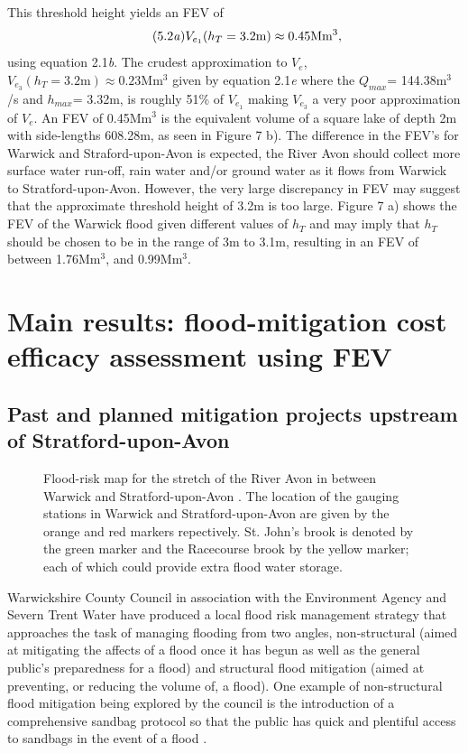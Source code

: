 \documentclass[11pt,a4paper]{article}
\begin{document}
This threshold height yields an FEV of
\begin{equation}\tag{5.2\textit{a}}
V_{e_1}(h_T=\text{3.2m})\approx 0.45\text{Mm$^3$},
\end{equation}
using equation 2.1\textit{b}. The crudest approximation to $V_e$, $V_{e_3}(h_T=\text{3.2m})\approx 0.23\text{Mm$^3$}$ given by equation 2.1\textit{e} where the $Q_{max}$= 144.38m$^3$/s and $h_{max}$= 3.32m, is roughly 51\% of $V_{e_1}$ making $V_{e_3}$ a very poor approximation of $V_e$. An FEV of 0.45Mm$^3$ is the equivalent volume of a square lake of depth 2m with side-lengths 608.28m, as seen in Figure 7 b). The difference in the FEV's for Warwick and Straford-upon-Avon is expected, the River Avon should collect more surface water run-off, rain water and/or ground water as it flows from Warwick to Stratford-upon-Avon. However, the very large discrepancy in FEV may suggest that the approximate threshold height of 3.2m is too large. Figure 7 a) shows the FEV of the Warwick flood given different values of $h_T$ and may imply that $h_T$ should be chosen to be in the range of 3m to 3.1m, resulting in an FEV of between 1.76Mm$^3$, and 0.99Mm$^3$.

\section{Main results: flood-mitigation cost efficacy assessment using FEV}
\subsection{Past and planned mitigation projects upstream of Stratford-upon-Avon}
\begin{figure}[ht!]
\begin{center}
\caption{Flood-risk map for the stretch of the River Avon in between Warwick and Stratford-upon-Avon \cite{flood-risk}. The location of the gauging stations in Warwick and Stratford-upon-Avon are given by the orange and red markers repectively. St. John's brook is denoted by the green marker and the Racecourse brook by the yellow marker{;} each of which could provide extra flood water storage.}
\end{center}
\end{figure}

Warwickshire County Council in association with the Environment Agency and Severn Trent Water have produced a local flood risk management strategy \cite{war1} that approaches the task of managing flooding from two angles, non-structural (aimed at mitigating the affects of a flood once it has begun as well as the general public's preparedness for a flood) and structural flood mitigation (aimed at preventing, or reducing the volume of, a flood). One example of non-structural flood mitigation being explored by the council is the introduction of a comprehensive sandbag protocol so that the public has quick and plentiful access to sandbags in the event of a flood \cite{war1}. 
\end{document}
